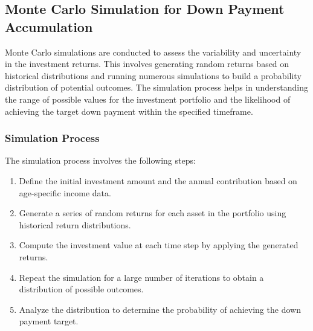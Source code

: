 \subsection{Monte Carlo Simulation for Down Payment Accumulation}
Monte Carlo simulations are conducted to assess the variability and uncertainty in the investment returns. This involves generating random returns based on historical distributions and running numerous simulations to build a probability distribution of potential outcomes. The simulation process helps in understanding the range of possible values for the investment portfolio and the likelihood of achieving the target down payment within the specified timeframe.

\subsubsection{Simulation Process}
The simulation process involves the following steps:
\begin{enumerate}
    \item Define the initial investment amount and the annual contribution based on age-specific income data.
    \item Generate a series of random returns for each asset in the portfolio using historical return distributions.
    \item Compute the investment value at each time step by applying the generated returns.
    \item Repeat the simulation for a large number of iterations to obtain a distribution of possible outcomes.
    \item Analyze the distribution to determine the probability of achieving the down payment target.
\end{enumerate}

\newpage

